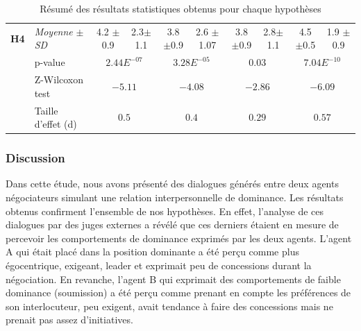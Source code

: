 {\begin{table}
\begin{adjustbox}{angle=90}
\begin{tabular}{|ll|c|c|c|c|c|c|c|c|}
						\newline \multirow{4}{*} {\textbf{H4}} & \multicolumn{1}{|l|}{ \textit{Moyenne} $\pm$ \textit{SD} } & 4.2 $\pm$ 0.9 & 2.3$\pm$ 1.1  & 3.8 $\pm$0.9 & 2.6 $\pm$1.07 & 3.8 $\pm$0.9  & 2.8$\pm$ 1.1  & 4.5 $\pm$0.5  & 1.9 $\pm$ 0.9\\
						\cline{2-10}
						\newline & \multicolumn{1}{|l|}{p-value} & \multicolumn{2}{c|}{ $2.44E^{-07}$} & \multicolumn{2}{c|}{ $3.28E^{-05}$} & \multicolumn{2}{c|}{ $0.03$}& \multicolumn{2}{c|}{ $7.04E^{-10}$}\\
						\cline{2-10}	
						\newline & \multicolumn{1}{|l|}{Z-Wilcoxon test} & \multicolumn{2}{c|}{ $-5.11$} & \multicolumn{2}{c|}{ $-4.08$} & \multicolumn{2}{c|}{ $-2.86$}& \multicolumn{2}{c|}{ $-6.09$}\\
						\cline{2-10}	
						\newline & \multicolumn{1}{|l|}{Taille d'effet (d)} & \multicolumn{2}{c|}{ $0.5$} & \multicolumn{2}{c|}{ $0.4$} & \multicolumn{2}{c|}{ $0.29$}& \multicolumn{2}{c|}{ $0.57$}\\
						\hline	
					\end{tabular}
					
					\caption{Résumé des résultats statistiques obtenus pour chaque hypothèses}
					\label{tab:resetude1}
				\end{adjustbox}
			\end{table}
				
			\subsubsection{Discussion}	
				Dans cette étude, nous avons présenté des dialogues générés entre deux agents négociateurs simulant une relation interpersonnelle de dominance. 
				Les résultats obtenus confirment l'ensemble de nos hypothèses. En effet, l'analyse de ces dialogues par des juges externes a révélé que ces derniers étaient en mesure de percevoir les comportements de dominance exprimés par les deux agents. L'agent A qui était placé dans la position dominante a été perçu comme plus égocentrique, exigeant, leader et exprimait peu de concessions durant la négociation. En revanche, l'agent B qui exprimait des comportements de faible dominance (soumission) a été perçu comme prenant en compte les préférences de son interlocuteur, peu exigent, avait tendance à faire des concessions mais ne prenait pas assez d'initiatives.  
				
}
